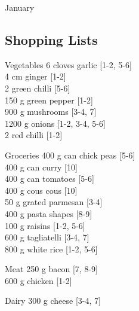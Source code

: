 \begin{menu}{January}
    \subsection*{Shopping Lists}
      \begin{shoppinglist}{Vegetables}
      6 cloves garlic 
        {\scriptsize[1-2, 5-6]}\\
      4 cm ginger 
        {\scriptsize[1-2]}\\
      2  green chilli 
        {\scriptsize[5-6]}\\
      150 g green pepper 
        {\scriptsize[1-2]}\\
      900 g mushrooms 
        {\scriptsize[3-4, 7]}\\
      1200 g onions 
        {\scriptsize[1-2, 3-4, 5-6]}\\
      2  red chilli 
        {\scriptsize[1-2]}\\
      \end{shoppinglist}%
      \begin{shoppinglist}{Groceries}
      400 g can chick peas 
        {\scriptsize[5-6]}\\
      400 g can curry 
        {\scriptsize[10]}\\
      400 g can tomatoes 
        {\scriptsize[5-6]}\\
      400 g cous cous 
        {\scriptsize[10]}\\
      50 g grated parmesan 
        {\scriptsize[3-4]}\\
      400 g pasta shapes 
        {\scriptsize[8-9]}\\
      100 g raisins 
        {\scriptsize[1-2, 5-6]}\\
      600 g tagliatelli 
        {\scriptsize[3-4, 7]}\\
      800 g white rice 
        {\scriptsize[1-2, 5-6]}\\
      \end{shoppinglist}%
      \par\vfil %
      \begin{shoppinglist}{Meat}
      250 g bacon 
        {\scriptsize[7, 8-9]}\\
      600 g chicken 
        {\scriptsize[1-2]}\\
      \end{shoppinglist}%
      \begin{shoppinglist}{Dairy}
      300 g cheese 
        {\scriptsize[3-4, 7]}\\

\end{shoppinglist}
\end{menu}
